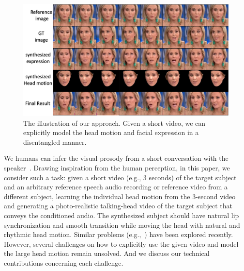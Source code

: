\documentclass[runningheads]{llncs}
\begin{document}
\begin{figure}[t]
\includegraphics[width= \linewidth]{latex/images/teaser.pdf}
\caption{The illustration of our approach. Given a short video, we can explicitly model the head motion and facial expression in a disentangled manner.}
\label{fig:teaser}
\end{figure}


We humans can infer the visual prosody from a short conversation with the speaker~\cite{munhall2004visual}. Drawing inspiration from the human perception, in this paper, we consider such a task: given a short video (e.g., 3 seconds) of the target subject and an arbitrary reference speech audio recording or reference video from a different subject, learning the individual head motion from the 3-second video and generating a photo-realistic talking-head video of the target subject that conveys the conditioned audio. The synthesized subject should have natural lip synchronization and smooth transition while moving the head with natural and rhythmic head motion. Similar problems (e.g.,~\cite{chung2017you,zhou2019talking,ijcai2019-129,vougioukas2019realistic,chen2019hierarchical,wiles2018x2face,zakharov2019few,wang2018fewshotvid2vid}) have been explored recently. However, several challenges on how to explicitly use the given video and model the large head motion remain unsolved. And we discuss our technical contributions concerning each challenge.

\end{document}
